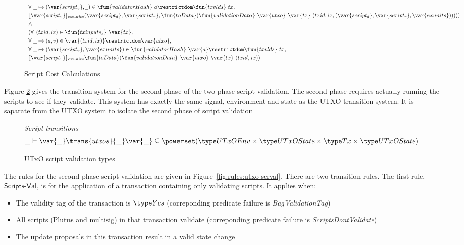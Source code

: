 \begin{figure}[htb]
\begin{align*}
    & ~~\forall ~\wcard\mapsto (\var{script_v},\wcard)\in \fun{validatorHash}~{a}\restrictdom\fun{txvlds}~{tx}, \\
    & ~~ \llbracket \var{script_v} \rrbracket_{exunits} (\var{script_d},\var{script_r},
    \fun{toData}(\fun{validationData}~\var{utxo}~\var{tx}~
      (txid,ix,(\var{script_d},\var{script_r},\var{exunits})))) ) \\
    & ~~\wedge~ \\
    & ~~(\forall~(txid,ix) \in \fun{txinputs_s}~\var{tx}, \\
    & ~~ \forall~\wcard \mapsto (a,v) \in \var{(txid,ix)}\restrictdom\var{utxo}, \\
    & ~~\forall ~\wcard\mapsto (\var{script_v},\var{exunits})\in
     \fun{validatorHash}~\var{a}\restrictdom\fun{txvlds}~{tx}, \\
    & ~~ \llbracket \var{script_v} \rrbracket_{exunits}
    \fun{toData}(\fun{validationData}~\var{utxo}~\var{tx}~
      (txid,ix)) \\
  \end{align*}
  \caption{Script Cost Calculations}
  \label{fig:functions:script2}
\end{figure}

Figure \ref{fig:ts-types:utxo-scripts} gives the transition system for the second phase of
the two-phase script validation. The second phase requires actually running
the scripts to see if they validate. This system has exactly the same
signal, environment and state as the UTXO transition system. It is saparate
from the UTXO system to isolate the second phase of script validation

\begin{figure}[htb]
  \emph{Script transitions}
  \begin{equation*}
    \_ \vdash
    \var{\_} \trans{utxos}{\_} \var{\_}
    \subseteq \powerset (\UTxOEnv \times \UTxOState \times \Tx \times \UTxOState)
  \end{equation*}
  \caption{UTxO script validation types}
  \label{fig:ts-types:utxo-scripts}
\end{figure}

The rules for the second-phase script validation are given in
Figure~\ref{fig:rules:utxo-scrval}. There are two transition rules.
The first rule, $\mathsf{Scripts\mbox{-}Val}$,
is for the application of a transaction containing only
validating scripts. It applies when:

\begin{itemize}
  \item The validity tag of the transaction is $\Yes$
  (correponding predicate failure is \emph{BagValidationTag})
  \item All scripts (Plutus and multisig) in that transaction validate
  (correponding predicate failure is \emph{ScriptsDontValidate})
  \item The update proposals in this transaction result in a valid state change
\end{itemize}

